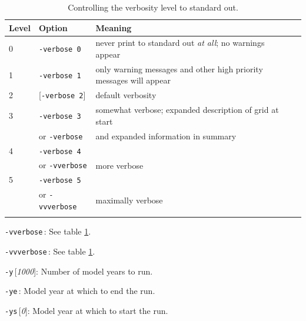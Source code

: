 \documentclass[11pt,final]{amsart}
\renewcommand{\t}[1]{\texttt{#1}}
\newcommand{\rawopt}[1]{\vspace{1mm}\noindent \large\texttt{-#1}\normalsize}
\newcommand{\opt}[1]{\rawopt{#1}\,:\quad}
\newcommand{\optdef}[2]{\rawopt{#1}\,[\textsl{#2}]:\quad}
\newcommand{\optrestrict}[2]{\rawopt{#1}\,[\texttt{#2} \textsl{only}]:\quad}
\newcommand{\optdefrestrict}[3]{\rawopt{#1}\,[\textsl{#2}]\,[\texttt{#3} \textsl{only}]:\quad}
\newcommand{\und}{$\underline{\,\,\,}$}
\begin{document}
\begin{table}[h]
\caption{Controlling the verbosity level to standard out.}\label{tab:verbosity}
\begin{tabular}{@{}llll}\hline
\textbf{Level} & \textbf{Option} & \textbf{Meaning} \\ \hline
   0  &  \t{-verbose 0} &   never print to standard out \emph{at all}; no warnings appear  \\
   1  &  \t{-verbose 1} &   only warning messages and other high priority messages will appear  \\
   2  &  [\t{-verbose 2}] & default verbosity    \\
   3  &  \t{-verbose 3} &   somewhat verbose; expanded description of grid at start  \\
      &  or \quad \t{-verbose} &  and expanded information in summary    \\
   4  &  \t{-verbose 4} &     \\
      &  or \quad \t{-vverbose} &  more verbose    \\
   5  &  \t{-verbose 5} &     \\
      &  or \quad \t{-vvverbose} &  maximally verbose \\
\hline
\normalsize
\end{tabular}
\end{table}

\opt{vverbose}   See table \ref{tab:verbosity}.

\opt{vvverbose}   See table \ref{tab:verbosity}.

\optdef{y}{1000} Number of model years to run.

\opt{ye} Model year at which to end the run.

\optdef{ys}{0} Model year at which to start the run.

\end{document}
